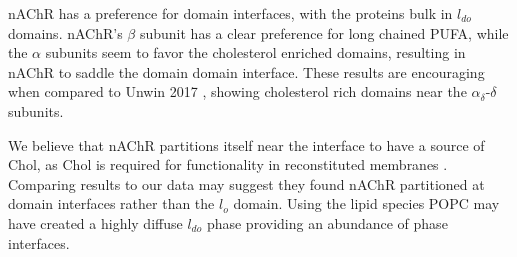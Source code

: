 nAChR has a preference for domain interfaces, with the proteins bulk in $l_{do}$ domains. nAChR's $\beta$ subunit has a clear preference for long chained PUFA, while the $\alpha$ subunits seem to favor the cholesterol enriched domains, resulting in  nAChR to saddle the domain domain interface. These results are encouraging when compared to Unwin 2017 \cite{Zuber_Structure_2013}, showing cholesterol rich domains near the $\alpha_{\delta}$-$\delta$ subunits. 

We believe that nAChR partitions itself near the interface to have a source of Chol, as Chol is required for functionality in reconstituted membranes \cite{Fong_Correlation_1986,Sunshine_Lipid_1992,Hamouda_Assessing_2006,Butler_FTIR_1993,Bhushan_Correlation_1993,Fong_Stabilization_1987,Bednarczyk_Transmembrane_2002,Corrie_Lipid_2002}. Comparing \cite{Perillo_Transbilayer_2016} results to our data may suggest they found nAChR partitioned at domain interfaces rather than the $l_o$ domain. Using the lipid species POPC may have created a highly diffuse $l_{do}$ phase providing an abundance of phase interfaces.




